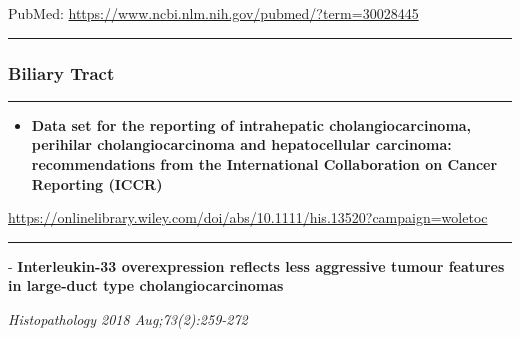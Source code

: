 \documentclass[]{article}
\providecommand{\tightlist}{%
  \setlength{\itemsep}{0pt}\setlength{\parskip}{0pt}}
\begin{document}
PubMed: \url{https://www.ncbi.nlm.nih.gov/pubmed/?term=30028445}

{}

{}

\begin{center}\rule{0.5\linewidth}{\linethickness}\end{center}

\hypertarget{biliary-tract}{%
\subsubsection{Biliary Tract}\label{biliary-tract}}

\begin{center}\rule{0.5\linewidth}{\linethickness}\end{center}

\begin{itemize}
\tightlist
\item
  \textbf{Data set for the reporting of intrahepatic cholangiocarcinoma,
  perihilar cholangiocarcinoma and hepatocellular carcinoma:
  recommendations from the International Collaboration on Cancer
  Reporting (ICCR)}
\end{itemize}

\url{https://onlinelibrary.wiley.com/doi/abs/10.1111/his.13520?campaign=woletoc}

\begin{center}\rule{0.5\linewidth}{\linethickness}\end{center}

 - \textbf{Interleukin-33 overexpression reflects less aggressive tumour
features in large-duct type cholangiocarcinomas}

\emph{Histopathology 2018 Aug;73(2):259-272}
\end{document}
